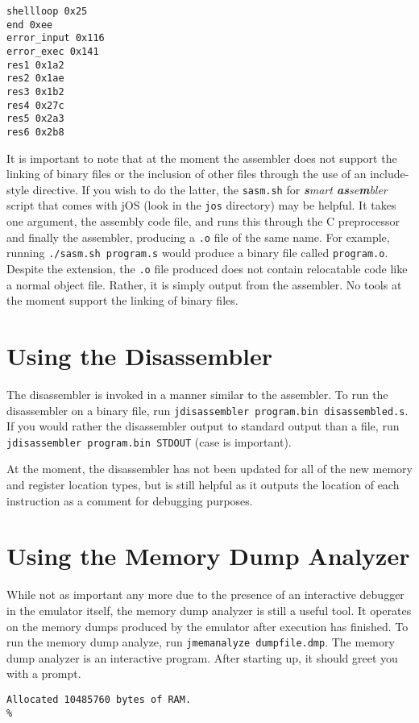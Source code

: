 \documentclass[12pt,letterpaper,titlepage,twoside]{book}
\begin{document}
\begin{verbatim}
shellloop 0x25
end 0xee
error_input 0x116
error_exec 0x141
res1 0x1a2
res2 0x1ae
res3 0x1b2
res4 0x27c
res5 0x2a3
res6 0x2b8
\end{verbatim}

It is important to note that at the moment the assembler does not support the linking of binary files or the inclusion of other files through the use of an include-style directive. If you wish to do the latter, the \verb|sasm.sh| for \textit{\textbf{s}mart \textbf{as}se\textbf{m}bler} script that comes with jOS (look in the \verb|jos| directory) may be helpful. It takes one argument, the assembly code file, and runs this through the C preprocessor and finally the assembler, producing a \verb|.o| file of the same name. For example, running \verb|./sasm.sh program.s| would produce a binary file called \verb|program.o|. Despite the extension, the \verb|.o| file produced does not contain relocatable code like a normal object file. Rather, it is simply output from the assembler. No tools at the moment support the linking of binary files.
\section{Using the Disassembler}
The disassembler is invoked in a manner similar to the assembler. To run the disassembler on a binary file, run \verb|jdisassembler program.bin disassembled.s|. If you would rather the disassembler output to standard output than a file, run \verb|jdisassembler program.bin STDOUT| (case is important).

At the moment, the disassembler has not been updated for all of the new memory and register location types, but is still helpful as it outputs the location of each instruction as a comment for debugging purposes.
\section{Using the Memory Dump Analyzer}
While not as important any more due to the presence of an interactive debugger in the emulator itself, the memory dump analyzer is still a useful tool. It operates on the memory dumps produced by the emulator after execution has finished. To run the memory dump analyze, run \verb|jmemanalyze dumpfile.dmp|. The memory dump analyzer is an interactive program. After starting up, it should greet you with a prompt.

\begin{verbatim}
Allocated 10485760 bytes of RAM.
% 
\end{verbatim}
\end{document}
